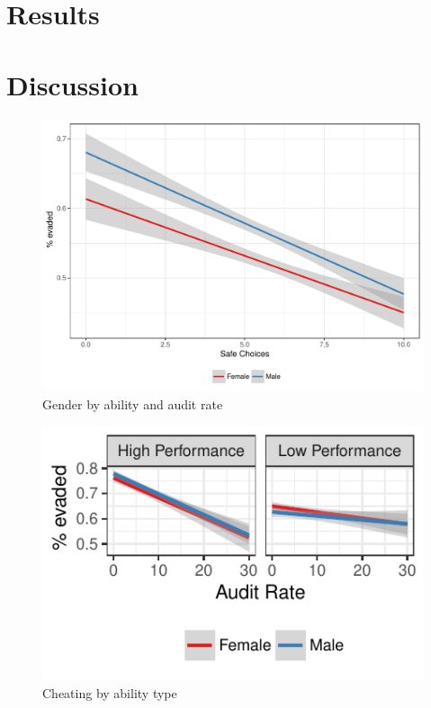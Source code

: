 \documentclass[9pt,twocolumn,twoside]{pnas-new}
\begin{document}
\section{Results}

\section{Discussion}


\begin{figure}[tbhp]
\centering
\includegraphics[width=.8\linewidth]{Figures/perevaded_genderxsafechoices07Aug2017}
\caption{Gender by ability and audit rate}
\label{fig:frog}
\end{figure}


\begin{figure}[tbhp]
\centering
\includegraphics[width=.8\linewidth]{cheat_genderxability07Aug2017}
\caption{Cheating by ability type}\label{fig:side}
\end{figure}

\end{document}
